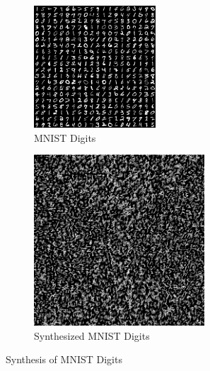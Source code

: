 \documentclass{article}
\begin{document}
\begin{figure}[H]
    \centering
    \begin{subfigure}[b]{0.49\textwidth}
        \centering
        \includegraphics[width=0.5\textwidth]{../Code/Textures/mnist.png}
        \caption{MNIST Digits}
        \label{fig:original-mnist}
    \end{subfigure}
    \hfill %
    \begin{subfigure}[b]{0.49\textwidth}
        \centering
        \includegraphics[width=0.7\textwidth]{../Result/mnist-patch-11.png}
        \caption{Synthesized MNIST Digits}
        \label{fig:synthesized-mnist}
    \end{subfigure}
    \caption{Synthesis of MNIST Digits}
    \label{fig:synthesis-mnist}
\end{figure}
\end{document}
